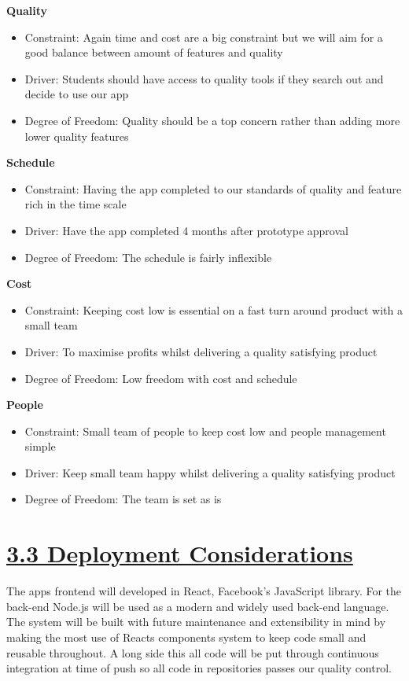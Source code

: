 \documentclass[a4paper]{article}
\begin{document}
\noindent\textbf{Quality}
\begin{itemize}
	\item Constraint: Again time and cost are a big constraint but we will aim for a good balance between amount of features and quality
	\item Driver: Students should have access to quality tools if they search out and decide to use our app
	\item Degree of Freedom: Quality should be a top concern rather than adding more lower quality features 
\end{itemize}

\noindent\textbf{Schedule}
\begin{itemize}
	\item Constraint: Having the app completed to our standards of quality and feature rich in the time scale
	\item Driver: Have the app completed 4 months after prototype approval
	\item Degree of Freedom: The schedule is fairly inflexible
\end{itemize}

\noindent\textbf{Cost}
\begin{itemize}
	\item Constraint: Keeping cost low is essential on a fast turn around product with a small team
	\item Driver: To maximise profits whilst delivering a quality satisfying product
	\item Degree of Freedom: Low freedom with cost and schedule
\end{itemize}

\noindent\textbf{People}
\begin{itemize}
	\item Constraint: Small team of people to keep cost low and people management simple
	\item Driver: Keep small team happy whilst delivering a quality satisfying product
	\item Degree of Freedom: The team is set as is
\end{itemize}
\pagebreak

\section*{\underline{3.3 Deployment Considerations}}
The apps frontend will developed in React, Facebook's JavaScript library. For the back-end Node.js will be used as a modern and widely used back-end language. The system will be built with future maintenance and extensibility in mind by making the most use of Reacts components system to keep code small and reusable throughout. A long side this all code will be put through continuous integration at time of push so all code in repositories passes our quality control.
\end{document}
